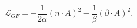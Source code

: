 \begin{equation}
\mathcal{L}_{GF}=-\frac{1}{2\alpha}(n \cdot A)^2-\frac{1}{\beta}(\partial
\cdot A)^2.
\end{equation}

